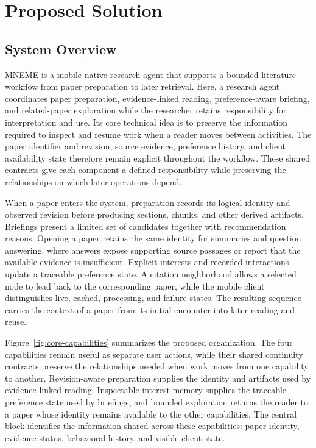 \section{Proposed Solution}

\subsection{System Overview}

MNEME is a mobile-native research agent that supports a bounded literature workflow from paper preparation to later retrieval.
Here, a research agent coordinates paper preparation, evidence-linked reading, preference-aware briefing, and related-paper exploration while the researcher retains responsibility for interpretation and use.
Its core technical idea is to preserve the information required to inspect and resume work when a reader moves between activities.
The paper identifier and revision, source evidence, preference history, and client availability state therefore remain explicit throughout the workflow.
These shared contracts give each component a defined responsibility while preserving the relationships on which later operations depend.

When a paper enters the system, preparation records its logical identity and observed revision before producing sections, chunks, and other derived artifacts.
Briefings present a limited set of candidates together with recommendation reasons.
Opening a paper retains the same identity for summaries and question answering, where answers expose supporting source passages or report that the available evidence is insufficient.
Explicit interests and recorded interactions update a traceable preference state.
A citation neighborhood allows a selected node to lead back to the corresponding paper, while the mobile client distinguishes live, cached, processing, and failure states.
The resulting sequence carries the context of a paper from its initial encounter into later reading and reuse.

Figure~\ref{fig:core-capabilities} summarizes the proposed organization.
The four capabilities remain useful as separate user actions, while their shared continuity contracts preserve the relationships needed when work moves from one capability to another.
Revision-aware preparation supplies the identity and artifacts used by evidence-linked reading.
Inspectable interest memory supplies the traceable preference state used by briefings, and bounded exploration returns the reader to a paper whose identity remains available to the other capabilities.
The central block identifies the information shared across these capabilities: paper identity, evidence status, behavioral history, and visible client state.

